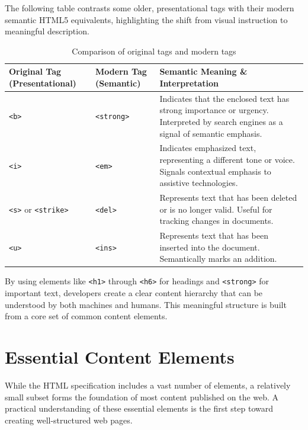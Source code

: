 \documentclass{scrbook}
\begin{document}
The following table contrasts some older, presentational tags with their modern semantic HTML5 equivalents, highlighting the shift from visual instruction to meaningful description.

\begin{table}[h!]
    \centering
    \begin{tabularx}{\textwidth}{|X|X|X|}
        \hline
        \textbf{Original Tag (Presentational)} & \textbf{Modern Tag (Semantic)} & \textbf{Semantic Meaning \& Interpretation} \\
        \hline

        \texttt{<b>} & \texttt{<strong>} &
        Indicates that the enclosed text has strong importance or urgency. Interpreted by search engines as a signal of semantic emphasis. \\
        \hline

        \texttt{<i>} & \texttt{<em>} &
        Indicates emphasized text, representing a different tone or voice. Signals contextual emphasis to assistive technologies. \\
        \hline

        \texttt{<s>} or \texttt{<strike>} & \texttt{<del>} &
        Represents text that has been deleted or is no longer valid. Useful for tracking changes in documents. \\
        \hline

        \texttt{<u>} & \texttt{<ins>} &
        Represents text that has been inserted into the document. Semantically marks an addition. \\
        \hline
    \end{tabularx}
    \caption{Comparison of original tags and modern tags}
\end{table}

By using elements like  \texttt{<h1>} through  \texttt{<h6>} for headings and  \texttt{<strong>} for important text, developers create a clear content hierarchy that can be understood by both machines and humans. This meaningful structure is built from a core set of common content elements.

\chapter{Essential Content Elements}

While the HTML specification includes a vast number of elements, a relatively small subset forms the foundation of most content published on the web. A practical understanding of these essential elements is the first step toward creating well-structured web pages.
\end{document}

